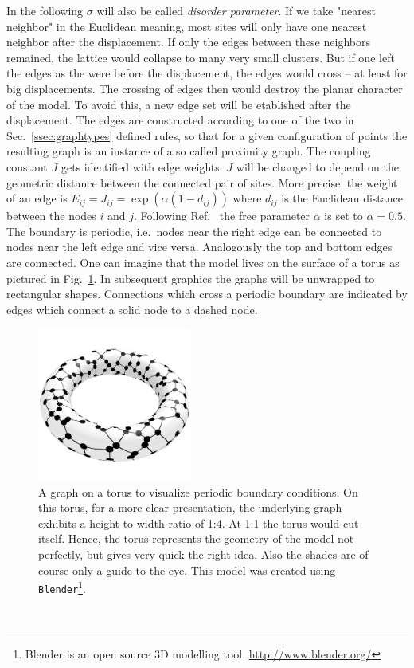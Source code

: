     In the following \(\sigma\) will also be called \emph{disorder parameter}.
    If we take "nearest neighbor" in the Euclidean meaning, most sites
    will only have one nearest neighbor after the
    displacement. If only the edges between these neighbors remained,
    the lattice would collapse to many very small clusters. But if one
    left the edges as the were before the displacement, the edges would
    cross -- at least for big displacements. The crossing of edges then
    would destroy the planar character of the model.
    To avoid this, a new edge set will be etablished after the displacement.
    The edges are constructed according to
    one of the two in Sec.\ \ref{ssec:graphtypes} defined rules,
    so that for a given configuration of points the resulting graph is an
    instance of a so called proximity graph. The coupling constant \(J\) gets
    identified with edge weights. \(J\) will be changed to depend on the
    geometric distance between the connected pair of sites. More precise,
    the weight of an edge is \(E_{ij} = J_{ij} = \exp (\alpha (1-d_{ij}))\)
    where \(d_{ij}\) is the Euclidean
    distance between the nodes \(i\) and \(j\). Following Ref.\ \cite{Lima2000}
    the free parameter \(\alpha\) is set to \(\alpha = 0.5\).
    The boundary is periodic, i.e.\ nodes near the right edge can be
    connected to nodes near the left edge and vice versa. Analogously the
    top and bottom edges are connected. One can imagine that the model
    lives on the surface of a torus as pictured in Fig.\ \ref{fig:torusRNG}.
    In subsequent graphics the graphs will be unwrapped to rectangular
    shapes. Connections which cross a periodic boundary are indicated
    by edges which connect a solid node to a dashed node.
    \begin{figure}[htbp]
        \centering
        \includegraphics[width=0.45\textwidth]{images/torus}
        \caption[A Graph on a Torus to Visualise Periodic Boundary Conditions]
        {
            A graph on a torus to visualize periodic boundary conditions.
            On this torus, for a more clear presentation, the underlying
            graph exhibits a height to width ratio of 1:4. At 1:1 the torus would cut
            itself. Hence, the torus represents the geometry of the model
            not perfectly, but gives very quick the right idea.
            Also the shades are of course only a guide to the eye.
            This model was created using \texttt{Blender}\footnote{Blender is an open source 3D modelling tool. \url{http://www.blender.org/}}.
        }
        \label{fig:torusRNG}
    \end{figure}\\
